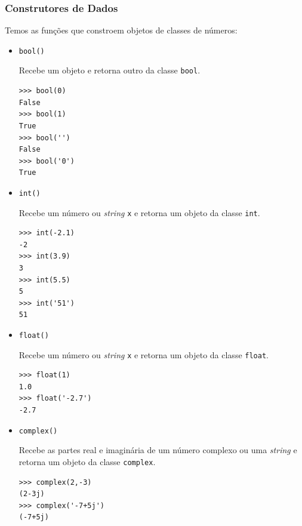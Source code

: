 \subsubsection{Construtores de Dados}

Temos as funções que constroem objetos de classes de números:
\begin{itemize}

\item \lstinline+bool()+ 

  Recebe um objeto e retorna outro da classe \lstinline+bool+.

\begin{lstlisting}
>>> bool(0)
False
>>> bool(1)
True
>>> bool('')
False
>>> bool('0')
True
\end{lstlisting}
  
\item \lstinline+int()+ 

  Recebe um número ou \textit{string} \lstinline+x+ e retorna um objeto da classe \lstinline+int+.

\begin{lstlisting}
>>> int(-2.1)
-2
>>> int(3.9)
3
>>> int(5.5)
5
>>> int('51')
51
\end{lstlisting}

\item \lstinline+float()+ 

  Recebe um número ou \textit{string} \lstinline+x+ e retorna um objeto da classe \lstinline+float+.

\begin{lstlisting}
>>> float(1)
1.0
>>> float('-2.7')
-2.7
\end{lstlisting}

\item \lstinline+complex()+ 

  Recebe as partes real e imaginária de um número complexo ou uma \textit{string} e retorna um objeto da classe \lstinline+complex+.

\begin{lstlisting}
>>> complex(2,-3)
(2-3j)
>>> complex('-7+5j')
(-7+5j)
\end{lstlisting}

\end{itemize}

